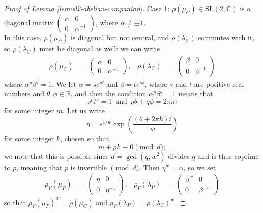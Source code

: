 \documentclass[10pt,a4paper]{amsart}
\newcommand{\C}{\mathbb{C}}
\newcommand{\R}{\mathbb{R}}
\newcommand\SL{\mathrm{SL}}
\begin{document}
\begin{proof}[Proof of Lemma \ref{lem:sl2-abelian-companion}]
\vspace{1em}\noindent
\underline{Case 1}: $\rho(\mu_C) \in \SL(2,\C)$ is a diagonal matrix $\left(\begin{smallmatrix} \alpha & 0 \\ 0 & \alpha^{-1} \end{smallmatrix}\right)$, where $\alpha \neq \pm1$.\\

In this case, $\rho(\mu_C)$ is diagonal but not central, and $\rho(\lambda_C)$ commutes with it, so $\rho(\lambda_C)$ must be diagonal as well: we can write
\begin{align*}
\rho(\mu_C) &= \begin{pmatrix} \alpha & 0 \\ 0 & \alpha^{-1} \end{pmatrix}, &
\rho(\lambda_C) &= \begin{pmatrix} \beta & 0 \\ 0 & \beta^{-1} \end{pmatrix}
\end{align*}
where $\alpha^p \beta^q = 1$.  We let $\alpha = s e^{i\theta}$ and $\beta = t e^{i\phi}$, where $s$ and $t$ are positive real numbers and $\theta,\phi\in\R$, and then the condition $\alpha^p\beta^q=1$ means that
\[
s^pt^q = 1 \,\textrm{ and }\,
p\theta + q\phi = 2\pi m
\]
for some integer $m$.  Let us write
\[ \eta = s^{1/w} \exp\left( \frac{(\theta+2\pi k)i}{w} \right) \]
for some integer $k$, chosen so that 
\[ m+pk \equiv 0 \pmod{d}; \]
we note that this is possible since $d=\gcd(q,w^2)$ divides $q$ and is thus coprime to $p$, meaning that $p$ is invertible $\!\!\!\pmod{d}$.   Then $\eta^w = \alpha$, so we set
\begin{align*}
\rho_V(\mu_P) &= \begin{pmatrix} \eta & 0 \\ 0 & \eta^{-1} \end{pmatrix}, &
\rho_V(\lambda_P) &= \begin{pmatrix} \beta^w & 0 \\ 0 & \beta^{-w} \end{pmatrix}
\end{align*}
so that $\rho_V(\mu_P)^w = \rho(\mu_C)$ and $\rho_V(\lambda_P) = \rho(\lambda_C)^w$.


\end{proof}
\end{document}
